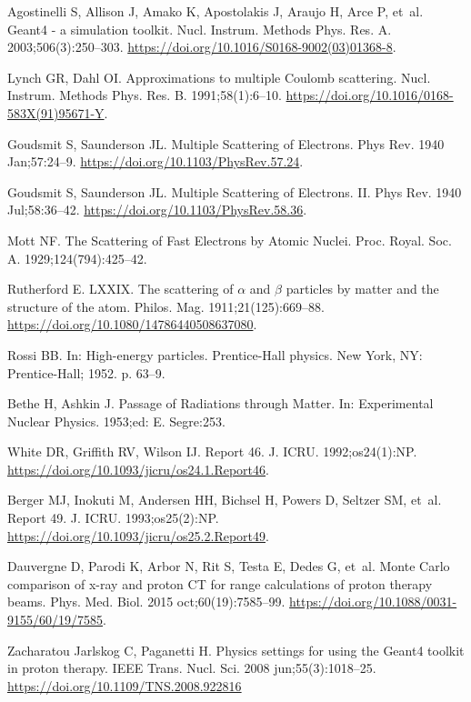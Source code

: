 \documentclass[preprint,times]{elsarticle}
\begin{document}
\begin{thebibliography}{99}
Agostinelli S, Allison J, Amako K, Apostolakis J, Araujo H, Arce P, et~al. Geant4 - a simulation toolkit. Nucl. Instrum. Methods Phys. Res. A. 2003;506(3):250--303. \url{https://doi.org/10.1016/S0168-9002(03)01368-8}.

Lynch GR, Dahl OI. Approximations to multiple Coulomb scattering. Nucl. Instrum. Methods Phys. Res. B. 1991;58(1):6--10. \url{https://doi.org/10.1016/0168-583X(91)95671-Y}.

Goudsmit S, Saunderson JL. Multiple Scattering of Electrons. Phys Rev. 1940 Jan;57:24--9. \url{https://doi.org/10.1103/PhysRev.57.24}.

Goudsmit S, Saunderson JL. Multiple Scattering of Electrons. II. Phys Rev. 1940 Jul;58:36--42. \url{https://doi.org/10.1103/PhysRev.58.36}.

Mott NF. The Scattering of Fast Electrons by Atomic Nuclei. Proc. Royal. Soc. A. 1929;124(794):425--42.

Rutherford E. LXXIX. The scattering of $\alpha$ and $\beta$ particles by matter and the structure of the atom. Philos. Mag. 1911;21(125):669--88. \url{https://doi.org/10.1080/14786440508637080}.

Rossi BB. In: {High-energy particles}. Prentice-Hall physics. New York, NY: Prentice-Hall; 1952. p. 63--9.

Bethe H, Ashkin J. Passage of Radiations through Matter. In: Experimental Nuclear Physics. 1953;ed: E. Segre:253.

White DR, Griffith RV, Wilson IJ. Report 46. J. ICRU. 1992;os24(1):NP. \url{https://doi.org/10.1093/jicru/os24.1.Report46}.

Berger MJ, Inokuti M, Andersen HH, Bichsel H, Powers D, Seltzer SM, et~al. Report 49. J. ICRU. 1993;os25(2):NP. \url{https://doi.org/10.1093/jicru/os25.2.Report49}.

Dauvergne D, Parodi K, Arbor N, Rit S, Testa E, Dedes G, et~al. {Monte Carlo comparison of x-ray and proton CT for range calculations of proton therapy beams}. Phys. Med. Biol. 2015 oct;60(19):7585--99. \url{https://doi.org/10.1088/0031-9155/60/19/7585}.

Zacharatou Jarlskog C, Paganetti H. Physics settings for using the Geant4 toolkit in proton therapy. IEEE Trans. Nucl. Sci. 2008 jun;55(3):1018--25. \url{https://doi.org/10.1109/TNS.2008.922816}


\end{thebibliography}
\end{document}
